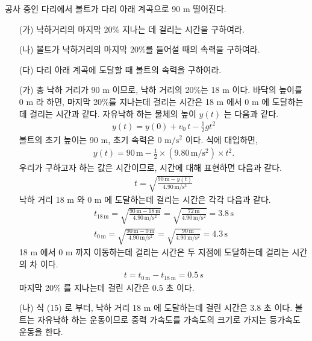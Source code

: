 \documentclass[APS,floatfix,nofootinbib,superscriptaddress,fleqn,preprint]{revtex4}
\begin{document}
\newpage

공사 중인 다리에서 볼트가 다리 아래 계곡으로 90 m 떨어진다.
\begin{itemize}
\item[(가)] 낙하거리의 마지막 20\% 지나는 데 걸리는 시간을 구하여라.
\item[(나)] 볼트가 낙하거리의 마지막 20\%를 들어설 때의 속력을
  구하여라.
\item[(다)] 다리 아래 계곡에 도달할 때 볼트의 속력을 구하여라.   
\end{itemize} 
\begin{itemize}
  \item[(가)] 총 낙하 거리가 90 m 이므로, 낙하 거리의 20\%는 18 m 이다. 
  바닥의 높이를 0 m 라 하면, 마지막 20\%를 지나는데 걸리는 시간은 18 m 에서 0 m 에 도달하는데 걸리는 시간과 같다.
  자유낙하 하는 물체의 높이 $y(t)$ 는 다음과 같다.
  \begin{align}
    y(t) = y(0) +v_0\,t-\frac{1}{2}gt^2
  \end{align}
  볼트의 초기 높이는 90 m, 초기 속력은 0 $\mathrm{m/s^2}$ 이다. 식에 대입하면,
  \begin{align}
    y(t) = 90\,\mathrm{m}-\frac{1}{2}\times (9.80\,\mathrm{m/s^2}) \times t^2.    
  \end{align}
  우리가 구하고자 하는 값은 시간이므로, 시간에 대해 표현하면 다음과 같다.
  \begin{align}
    t=\sqrt{\frac{90\,\mathrm{m}-y(t)}{4.90\,\mathrm{m/s^2}}}
  \end{align}
  낙하 거리 18 m 와 0 m 에 도달하는데 걸리는 시간은 각각 다음과 같다.
  \begin{align}
    t_{18\,\mathrm{m}}=\sqrt{\frac{90\,\mathrm{m}-18\,\mathrm{m}}{4.90\,\mathrm{m/s^2}}} = \sqrt{\frac{72\,\mathrm{m}}{4.90\,\mathrm{m/s^2}}}=3.8\,\mathrm{s} \\
    t_{0\,\mathrm{m}}=\sqrt{\frac{90\,\mathrm{m}-0\,\mathrm{m}}{4.90\,\mathrm{m/s^2}}} = \sqrt{\frac{90\,\mathrm{m}}{4.90\,\mathrm{m/s^2}}}=4.3\,\mathrm{s}
  \end{align}
  18 m 에서 0 m 까지 이동하는데 걸리는 시간은 두 지점에 도달하는데 걸리는 시간의 차 이다.
  \begin{align}
    t = t_{0\,\mathrm{m}}-t_{18\,\mathrm{m}}= 0.5\mathrm\,{s}
  \end{align}
  마지막 20\% 를 지나는데 걸린 시간은 0.5 초 이다.
  \item[(나)] 식 (15) 로 부터, 낙하 거리 18 m 에 도달하는데 걸린 시간은 3.8 초 이다. 
  볼트는 자유낙하 하는 운동이므로 중력 가속도를 가속도의 크기로 가지는 등가속도 운동을 한다.

\end{itemize}
\end{document}
